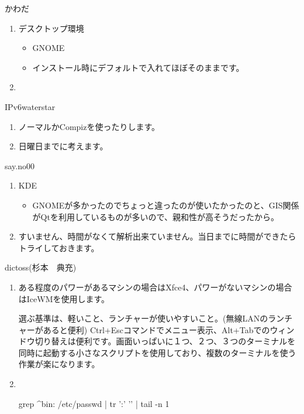\documentclass[mingoth,a4paper]{jsarticle}
\begin{document}
\begin{prework}{ かわだ }

\begin{enumerate}
 \item デスクトップ環境
\begin{itemize}
      \item   GNOME
      \item インストール時にデフォルトで入れてほぼそのままです。
\end{itemize}
  \item 　
\end{enumerate}
\end{prework}

\begin{prework}{ IPv6waterstar }

 \begin{enumerate}
       \item ノーマルかCompizを使ったりします。
       \item 日曜日までに考えます。
 \end{enumerate}
\end{prework}
\begin{prework}{ say.no00 }
    \begin{enumerate}
          \item KDE
        \begin{itemize}
              \item
            GNOMEが多かったのでちょっと違ったのが使いたかったのと、GIS関係がQtを利用しているものが多いので、親和性が高そうだったから。
        \end{itemize}
          \item すいません、時間がなくて解析出来ていません。当日までに時間ができたらトライしておきます。
    \end{enumerate}
\end{prework}
\begin{prework}{ dictoss(杉本　典充) }
 \begin{enumerate}
       \item ある程度のパワーがあるマシンの場合はXfce4、パワーがないマシンの場合はIceWMを使用します。

選ぶ基準は、軽いこと、ランチャーが使いやすいこと。(無線LANのランチャーがあると便利) Ctrl+Escコマンドでメニュー表示、Alt+Tabでのウィンドウ切り替えは便利です。画面いっぱいに１つ、２つ、３つのターミナルを同時に起動する小さなスクリプトを使用しており、複数のターミナルを使う作業が楽になります。
  \item 　
     \begin{commandline}
         grep ^bin: /etc/passwd | tr ':' '\n' | tail -n 1
     \end{commandline}
\end{enumerate}

\end{prework}
\end{document}

